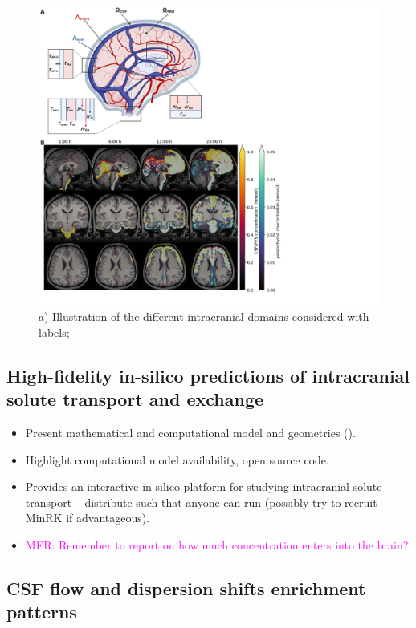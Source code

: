 \documentclass[fleqn,10pt]{wlscirep}
\newcommand{\mer}[1]{\textcolor{magenta}{#1}}
\begin{document}
\begin{figure}
    \centering
    \includegraphics[width=\textwidth]{figures/figure1.png}
     \caption{a) Illustration of the different intracranial domains
       considered with labels;}
     \label{fig:intracranial_domains}
\end{figure}


\subsection*{High-fidelity in-silico predictions of intracranial solute transport and exchange}

\begin{itemize}
\item
  Present mathematical and computational model and geometries (). 
\item
  Highlight computational model availability, open source code.
\item
  Provides an interactive in-silico platform for studying intracranial solute transport -- distribute such that anyone can run (possibly try to recruit MinRK if advantageous).
\item
  \mer{MER: Remember to report on how much concentration enters into the brain?}
\end{itemize}

\subsection*{CSF flow and dispersion shifts enrichment patterns}
\end{document}
